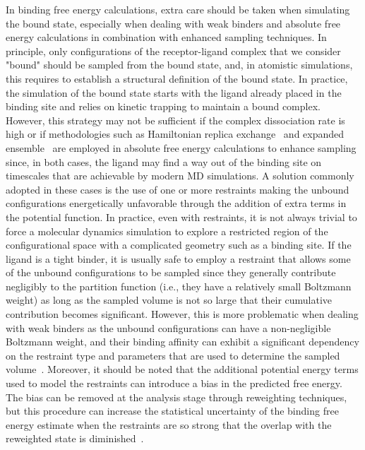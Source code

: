 \documentclass[9pt,bestpractices]{livecoms}
\begin{document}
In binding free energy calculations, extra care should be taken when simulating the bound state, especially when dealing with weak binders and absolute free energy calculations in combination with enhanced sampling techniques.
In principle, only configurations of the receptor-ligand complex that we consider "bound" should be sampled from the bound state, and, in atomistic simulations, this requires to establish a structural definition of the bound state.
In practice, the simulation of the bound state starts with the ligand already placed in the binding site and relies on kinetic trapping to maintain a bound complex.
However, this strategy may not be sufficient if the complex dissociation rate is high or if methodologies such as Hamiltonian replica exchange~\cite{bitetti-putzer2003generalized} and expanded ensemble~\cite{chodera2011replica} are employed in absolute free energy calculations to enhance sampling since, in both cases, the ligand may find a way out of the binding site on timescales that are achievable by modern MD simulations.
A solution commonly adopted in these cases is the use of one or more restraints making the unbound configurations energetically unfavorable through the addition of extra terms in the potential function.
In practice, even with restraints, it is not always trivial to force a molecular dynamics simulation to explore a restricted region of the configurational space with a complicated geometry such as a binding site.
If the ligand is a tight binder, it is usually safe to employ a restraint that allows some of the unbound configurations to be sampled since they generally contribute negligibly to the partition function (i.e., they have a relatively small Boltzmann weight) as long as the sampled volume is not so large that their cumulative contribution becomes significant.
However, this is more problematic when dealing with weak binders as the unbound configurations can have a non-negligible Boltzmann weight, and their binding affinity can exhibit a significant dependency on the restraint type and parameters that are used to determine the sampled volume~\cite{}.
Moreover, it should be noted that the additional potential energy terms used to model the restraints can introduce a bias in the predicted free energy.
The bias can be removed at the analysis stage through reweighting techniques, but this procedure can increase the statistical uncertainty of the binding free energy estimate when the restraints are so strong that the overlap with the reweighted state is diminished~\cite{}.
\end{document}
